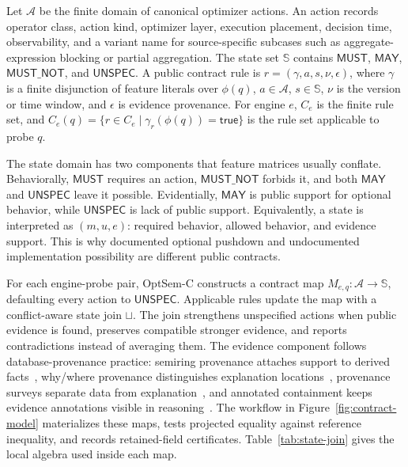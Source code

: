 \begin{definition}
Let $\mathcal{A}$ be the finite domain of canonical optimizer actions.  An action records operator class, action kind, optimizer layer, execution placement, decision time, observability, and a variant name for source-specific subcases such as aggregate-expression blocking or partial aggregation.  The state set $\mathbb{S}$ contains $\mathsf{MUST}$, $\mathsf{MAY}$, $\mathsf{MUST\_NOT}$, and $\mathsf{UNSPEC}$.  A public contract rule is $r=(\gamma,a,s,\nu,\epsilon)$, where $\gamma$ is a finite disjunction of feature literals over $\phi(q)$, $a\in\mathcal{A}$, $s\in\mathbb{S}$, $\nu$ is the version or time window, and $\epsilon$ is evidence provenance.  For engine $e$, $C_e$ is the finite rule set, and $C_e(q)=\{r\in C_e\mid \gamma_r(\phi(q))=\mathsf{true}\}$ is the rule set applicable to probe $q$.
\end{definition}

The state domain has two components that feature matrices usually conflate.  Behaviorally, $\mathsf{MUST}$ requires an action, $\mathsf{MUST\_NOT}$ forbids it, and both $\mathsf{MAY}$ and $\mathsf{UNSPEC}$ leave it possible.  Evidentially, $\mathsf{MAY}$ is public support for optional behavior, while $\mathsf{UNSPEC}$ is lack of public support.  Equivalently, a state is interpreted as $(m,u,e)$: required behavior, allowed behavior, and evidence support.  This is why documented optional pushdown and undocumented implementation possibility are different public contracts.

For each engine-probe pair, OptSem-C constructs a contract map $M_{e,q}:\mathcal{A}\rightarrow\mathbb{S}$, defaulting every action to $\mathsf{UNSPEC}$.  Applicable rules update the map with a conflict-aware state join $\sqcup$.  The join strengthens unspecified actions when public evidence is found, preserves compatible stronger evidence, and reports contradictions instead of averaging them.  The evidence component follows database-provenance practice: semiring provenance attaches support to derived facts~\cite{green2007provenance}, why/where provenance distinguishes explanation locations~\cite{buneman2001why}, provenance surveys separate data from explanation~\cite{cheney2009provenance}, and annotated containment keeps evidence annotations visible in reasoning~\cite{green2011containment}.  The workflow in Figure~\ref{fig:contract-model} materializes these maps, tests projected equality against reference inequality, and records retained-field certificates.  Table~\ref{tab:state-join} gives the local algebra used inside each map.

